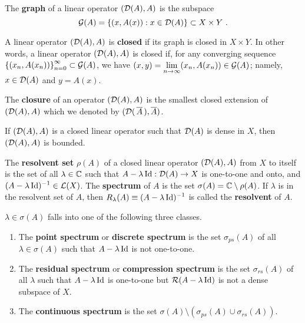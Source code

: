 \begin{defn}
The {\bfseries graph} of a linear operator
$(\mathcal{D}(A),A)$ is the subspace
\[
\mathcal{G}(A) = \left\{ (x,A(x)) : x \in \mathcal{D}(A) \right\} \subset X \times Y  \ .
\]
\end{defn}

\begin{defn}
A linear operator $(\mathcal{D}(A),A)$ is
{\bfseries closed} if its graph is
closed in $X\times Y$.  In other words, a linear operator $(\mathcal{D}(A),A)$
is closed if, for any converging sequence
$\displaystyle \left\{ (x_n, A(x_n)) \right\}_{n=0}^\infty \subset \mathcal{G}(A)$,
we have
$\displaystyle (x,y) = \lim_{n\to \infty} (x_n, A(x_n)) \in \mathcal{G}(A)$;
namely, $x\in \mathcal{D}(A)$ and $y=A(x)$.

The {\bfseries closure} of an operator
$(\mathcal{D}(A),A)$ is the smallest closed extension of $(\mathcal{D}(A),A)$ which we
denoted by $(\mathcal{D}(\,\overline{A}\,),\overline{A})$.
\end{defn}

\begin{theorem}
If $(\mathcal{D}(A),A)$ is a closed linear operator such that $\mathcal{D}(A)$ is
dense in $X$, then $(\mathcal{D}(A),A)$ is bounded.
\end{theorem}

\begin{defn}
The {\bfseries resolvent set}
$\rho(A)$ of a closed linear operator
$(\mathcal{D}(A),A)$ from $X$ to itself is the set of all $\lambda \in \mathbb{C}$
such that $A-\lambda \operatorname{Id}: \mathcal{D}(A) \rightarrow X$ is one-to-one and
onto, and $\displaystyle (A-\lambda\operatorname{Id})^{-1} \in \mathcal{L}(X)$.
The {\bfseries spectrum} of $A$ is the set
$\sigma(A) = \mathbb{C} \setminus \rho(A)$.
If $\lambda$ is in the resolvent set of $A$, then
$\displaystyle R_\lambda(A) \equiv (A-\lambda\operatorname{Id})^{-1}$ is
called the {\bfseries resolvent} of $A$.
\end{defn}

\begin{prop}
$\lambda \in \sigma(A)$ falls into one of the following three classes.
\begin{enumerate}
\item The {\bfseries point spectrum}
  or {\bfseries discrete spectrum}
  is the set $\sigma_{ps}(A)$ of all $\lambda \in \sigma(A)$ such that
  $A-\lambda \operatorname{Id}$ is not one-to-one.
\item The {\bfseries residual spectrum}
or {\bfseries compression spectrum}
is the set $\sigma_{rs}(A)$ of all $\lambda$ such that $A-\lambda \operatorname{Id}$
is one-to-one but $\mathcal{R}(A-\lambda \operatorname{Id})$ is not a dense subspace of $X$.
\item The {\bfseries continuous spectrum} 
is the set $\sigma(A) \setminus ( \sigma_{ps}(A) \cup \sigma_{rs}(A))$.
\end{enumerate}
\end{prop}


